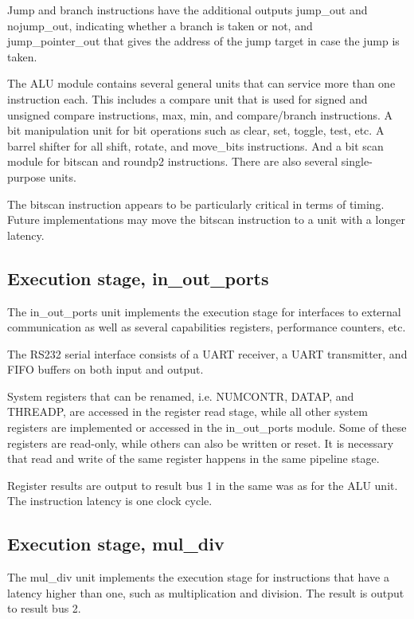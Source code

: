 \documentclass[11pt,a4paper,oneside,openright]{report}
\newcommand{\vv}{ \vspace{2mm} }   %
\begin{document}
Jump and branch instructions have the additional outputs jump\_out and nojump\_out, indicating whether a branch is taken or not, and jump\_pointer\_out that gives the address of the jump target in case the jump is taken.
\vv

The ALU module contains several general units that can service more than one instruction each. This includes a compare unit that is used for signed and unsigned compare instructions, max, min, and compare/branch instructions. A bit manipulation unit for bit operations such as clear, set, toggle, test, etc. A barrel shifter for all shift, rotate, and move\_bits instructions. And a bit scan module for bitscan and roundp2 instructions. There are also several single-purpose units.
\vv

The bitscan instruction appears to be particularly critical in terms of timing. Future implementations may move the bitscan instruction to a unit with a longer latency.
\vv


\subsection{Execution stage, in\_out\_ports}
The in\_out\_ports unit implements the execution stage for interfaces to external communication as well as several capabilities registers, performance counters, etc.
\vv

The RS232 serial interface consists of a UART receiver, a UART transmitter, and FIFO buffers on both input and output.
\vv

System registers that can be renamed, i.e. NUMCONTR, DATAP, and THREADP, are accessed in the register read stage, while all other system registers are implemented or accessed in the in\_out\_ports module. Some of these registers are read-only, while others can also be written or reset. It is necessary that read and write of the same register happens in the same pipeline stage.
\vv

Register results are output to result bus 1 in the same was as for the ALU unit. The instruction latency is one clock cycle.
\vv

\subsection{Execution stage, mul\_div}
The mul\_div unit implements the execution stage for instructions that have a latency higher than one, such as multiplication and division. The result is output to result bus 2.
\vv
\end{document}
